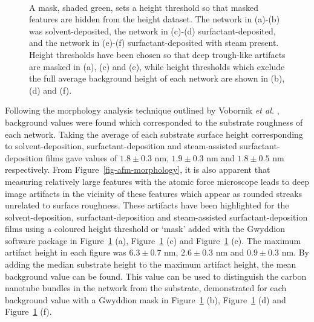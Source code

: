 \documentclass[
  a4paper,
]{scrbook}
\begin{document}
\begin{figure}
\begin{minipage}[t]{0.01\linewidth}
{\centering 

~

}

\end{minipage}%

\caption{\label{fig-cnt-mask}A mask, shaded green, sets a height
threshold so that masked features are hidden from the height dataset.
The network in (a)-(b) was solvent-deposited, the network in (c)-(d)
surfactant-deposited, and the network in (e)-(f) surfactant-deposited
with steam present. Height thresholds have been chosen so that deep
trough-like artifacts are masked in (a), (c) and (e), while height
thresholds which exclude the full average background height of each
network are shown in (b), (d) and (f).}

\end{figure}

Following the morphology analysis technique outlined by Vobornik
\emph{et al.} \autocite{Vobornik2023}, background values were found
which corresponded to the substrate roughness of each network. Taking
the average of each substrate surface height corresponding to
solvent-deposition, surfactant-deposition and steam-assisted
surfactant-deposition films gave values of \(1.8 \pm 0.3\) nm,
\(1.9 \pm 0.3\) nm and \(1.8 \pm 0.5\) nm respectively. From
Figure~\ref{fig-afm-morphology}, it is also apparent that measuring
relatively large features with the atomic force microscope leads to deep
image artifacts in the vicinity of these features which appear as
rounded streaks unrelated to surface roughness. These artifacts have
been highlighted for the solvent-deposition, surfactant-deposition and
steam-assisted surfactant-deposition films using a coloured height
threshold or `mask' added with the Gwyddion software package in
Figure~\ref{fig-cnt-mask} (a), Figure~\ref{fig-cnt-mask} (c) and
Figure~\ref{fig-cnt-mask} (e). The maximum artifact height in each
figure was \(6.3 \pm 0.7\) nm, \(2.6 \pm 0.3\) nm and \(0.9 \pm 0.3\)
nm. By adding the median substrate height to the maximum artifact
height, the mean background value can be found. This value can be used
to distinguish the carbon nanotube bundles in the network from the
substrate, demonstrated for each background value with a Gwyddion mask
in Figure~\ref{fig-cnt-mask} (b), Figure~\ref{fig-cnt-mask} (d) and
Figure~\ref{fig-cnt-mask} (f).
\end{document}
